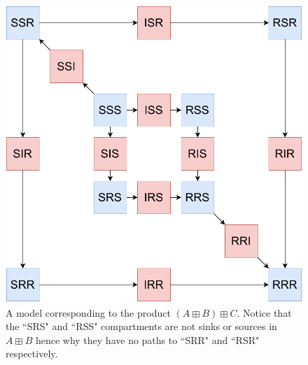 \documentclass{article}
\theoremstyle{definition}
\begin{document}
\begin{figure}
    \centering
    \includegraphics[width=\textwidth]{images_pdf/Three_strain_SIR_no_super_1.pdf}
    \caption{A model corresponding to the product $(A\boxplus B)\boxplus C$. Notice that the “SRS" and “RSS" compartments are not sinks or sources in $A\boxplus B$ hence why they have no paths to “SRR" and “RSR" respectively. }
    \label{fig:wp_act}
\end{figure}
\end{document}

